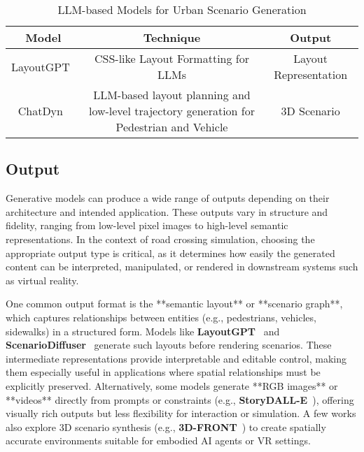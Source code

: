 \documentclass{article}
\begin{document}
\begin{table}[ht]
    \centering
    \begin{tabular}{|c|c|c|}
        \hline
        \textbf{Model} & \textbf{Technique} & \textbf{Output} \\ \hline        
        LayoutGPT~\cite{feng2023layoutgpt} & CSS-like Layout Formatting for LLMs & Layout Representation \\ \hline
        ChatDyn~\cite{wei2024chatdyn} & LLM-based layout planning and low-level trajectory generation for Pedestrian and Vehicle & 3D Scenario \\ 

    \end{tabular}
    \caption{LLM-based Models for Urban Scenario Generation}
    \label{tab:llm_based_models}
\end{table}

\subsection{Output}

Generative models can produce a wide range of outputs depending on their architecture and intended application. These outputs vary in structure and fidelity, ranging from low-level pixel images to high-level semantic representations. In the context of road crossing simulation, choosing the appropriate output type is critical, as it determines how easily the generated content can be interpreted, manipulated, or rendered in downstream systems such as virtual reality.

One common output format is the **semantic layout** or **scenario graph**, which captures relationships between entities (e.g., pedestrians, vehicles, sidewalks) in a structured form. Models like \textbf{LayoutGPT}~\cite{feng2023layoutgpt} and \textbf{ScenarioDiffuser}~\cite{yang2023scenariodiffuser} generate such layouts before rendering scenarios. These intermediate representations provide interpretable and editable control, making them especially useful in applications where spatial relationships must be explicitly preserved. Alternatively, some models generate **RGB images** or **videos** directly from prompts or constraints (e.g., \textbf{StoryDALL-E}~\cite{storydalle}), offering visually rich outputs but less flexibility for interaction or simulation. A few works also explore 3D scenario synthesis (e.g., \textbf{3D-FRONT}~\cite{fu20213dfront}) to create spatially accurate environments suitable for embodied AI agents or VR settings.
\end{document}
